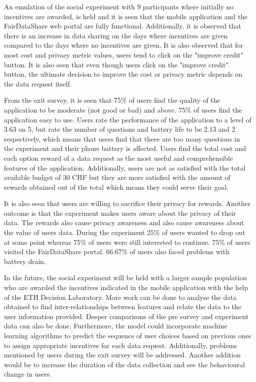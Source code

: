 An emulation of the social experiment with 9 participants where initially no incentives are awarded, is held and it is seen that the mobile application and the FairDataShare web portal are fully functional. Additionally, it is observed that there is an increase in data sharing on the days where incentives are given compared to the days where no incentives are given. It is also observed that for most cost and privacy metric values, users tend to click on the "improve credit" button. It is also seen that even though users click on the "improve credit" button, the ultimate decision to improve the cost or privacy metric depends on the data request itself.

From the exit survey, it is seen that 75\% of users find the quality of the application to be moderate (not good or bad) and above. 75\% of users find the application easy to use. Users rate the performance of the application to a level of 3.63 on 5, but rate the number of questions and battery life to be 2.13 and 2 respectively, which means that users find that there are too many questions in the experiment and their phone battery is affected. Users find the total cost and each option reward of a data request as the most useful and comprehensible features of the application. Additionally, users are not as satisfied with the total available budget of 30 CHF but they are more satisfied with the amount of rewards obtained out of the total which means they could serve their goal.

It is also seen that users are willing to sacrifice their privacy for rewards. Another outcome is that the experiment makes users aware about the privacy of their data. The rewards also cause privacy awareness and also cause awareness about the value of users data. During the experiment 25\% of users wanted to drop out at some point whereas 75\% of users were still interested to continue. 75\% of users visited the FairDataShare portal. 66.67\% of users also faced problems with battery drain.

In the future, the social experiment will be held with a larger sample population who are awarded the incentives indicated in the mobile application with the help of the ETH Decision Laboratory. More work can be done to analyse the data obtained to find inter-relationships between features and relate the data to the user information provided. Deeper comparisons of the pre survey and experiment data can also be done. Furthermore, the model could incorporate machine learning algorithms to predict the sequence of user choices based on previous ones to assign appropriate incentives for each data request. Additionally, problems mentioned by users during the exit survey will be addressed. Another addition would be to increase the duration of the data collection and see the behavioural change in users.
